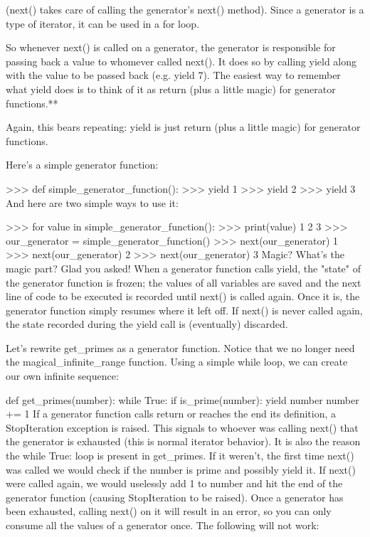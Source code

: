 (next() takes care of calling the generator's next() method). Since a generator is a type of iterator, it can be used in a for loop.

So whenever next() is called on a generator, the generator is responsible for passing back a value to whomever called next(). It does so by calling yield along with the value to be passed back (e.g. yield 7). The easiest way to remember what yield does is to think of it as return (plus a little magic) for generator functions.**

Again, this bears repeating: yield is just return (plus a little magic) for generator functions.

Here's a simple generator function:

>>> def simple_generator_function():
>>>    yield 1
>>>    yield 2
>>>    yield 3
And here are two simple ways to use it:

>>> for value in simple_generator_function():
>>>     print(value)
1
2
3
>>> our_generator = simple_generator_function()
>>> next(our_generator)
1
>>> next(our_generator)
2
>>> next(our_generator)
3
Magic?
What's the magic part? Glad you asked! When a generator function calls yield, the "state" of the generator function is frozen; the values of all variables are saved and the next line of code to be executed is recorded until next() is called again. Once it is, the generator function simply resumes where it left off. If next() is never called again, the state recorded during the yield call is (eventually) discarded.

Let's rewrite get_primes as a generator function. Notice that we no longer need the magical_infinite_range function. Using a simple while loop, we can create our own infinite sequence:

def get_primes(number):
    while True:
        if is_prime(number):
            yield number
        number += 1
If a generator function calls return or reaches the end its definition, a StopIteration exception is raised. This signals to whoever was calling next() that the generator is exhausted (this is normal iterator behavior). It is also the reason the while True: loop is present in get_primes. If it weren't, the first time next() was called we would check if the number is prime and possibly yield it. If next() were called again, we would uselessly add 1 to number and hit the end of the generator function (causing StopIteration to be raised). Once a generator has been exhausted, calling next() on it will result in an error, so you can only consume all the values of a generator once. The following will not work:

